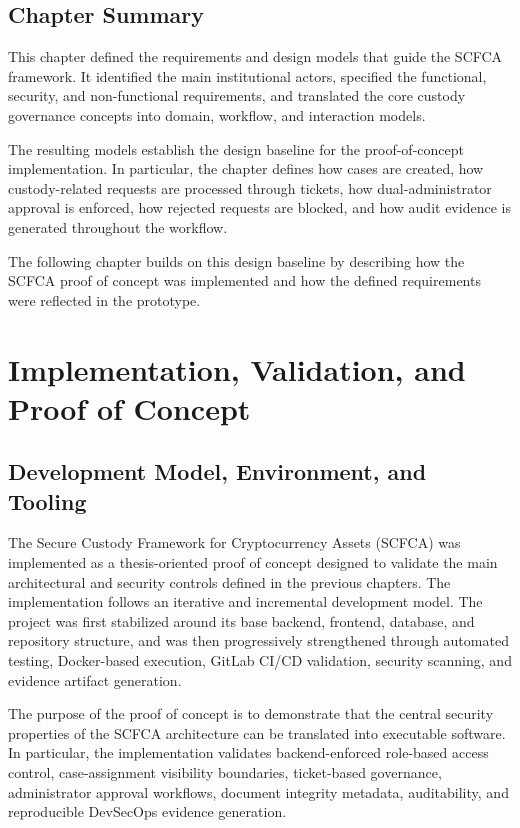 \documentclass[12pt,a4paper]{report}
\begin{document}
\section{Chapter Summary}
\label{sec:requirements-and-design-summary}

This chapter defined the requirements and design models that guide the SCFCA framework.
It identified the main institutional actors, specified the functional, security, and
non-functional requirements, and translated the core custody governance concepts into
domain, workflow, and interaction models.

The resulting models establish the design baseline for the proof-of-concept implementation.
In particular, the chapter defines how cases are created, how custody-related requests are
processed through tickets, how dual-administrator approval is enforced, how rejected
requests are blocked, and how audit evidence is generated throughout the workflow.

The following chapter builds on this design baseline by describing how the SCFCA proof of
concept was implemented and how the defined requirements were reflected in the prototype.



\chapter{Implementation, Validation, and Proof of Concept}
\label{ch:implementation-validation-poc}

\section{Development Model, Environment, and Tooling}

The Secure Custody Framework for Cryptocurrency Assets (SCFCA) was implemented as a thesis-oriented proof of concept designed to validate the main architectural and security controls defined in the previous chapters. The implementation follows an iterative and incremental development model. The project was first stabilized around its base backend, frontend, database, and repository structure, and was then progressively strengthened through automated testing, Docker-based execution, GitLab CI/CD validation, security scanning, and evidence artifact generation.

The purpose of the proof of concept is to demonstrate that the central security properties of the SCFCA architecture can be translated into executable software. In particular, the implementation validates backend-enforced role-based access control, case-assignment visibility boundaries, ticket-based governance, administrator approval workflows, document integrity metadata, auditability, and reproducible DevSecOps evidence generation.
\end{document}
